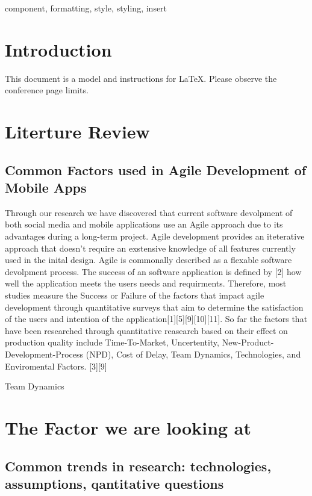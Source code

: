 \documentclass[conference]{IEEEtran}
\begin{document}
\begin{IEEEkeywords}
component, formatting, style, styling, insert
\end{IEEEkeywords}

\section{Introduction}
This document is a model and instructions for \LaTeX.
Please observe the conference page limits. 

\section{Literture Review}

\subsection{Common Factors used in Agile Development of Mobile Apps}

Through our research we have discovered that current software devolpment of both social media and mobile applications
use an Agile approach due to its advantages during a long-term project. Agile development provides an iteterative approach
that doesn't require an exstensive knowledge of all features currently used in the inital design. Agile is commonally described as a flexable software
devolpment process. The success of an software application is defined by [2] how well the application meets the users needs and requirments.
Therefore, most studies measure the Success or Failure of the factors that impact agile development
through quantitative surveys that aim to determine the satisfaction of the users and intention of the application[1][5][9][10][11].
So far the factors that have been researched through quantitative reasearch based on their effect on production quality include Time-To-Market, Uncertentity, 
New-Product-Development-Process (NPD), Cost of Delay, Team Dynamics, Technologies, and Enviromental Factors. [3][9] 

Team Dynamics

\section{The Factor we are looking at}


\subsection{Common trends in research: technologies, assumptions, qantitative questions}\label{AA}
\end{document}
